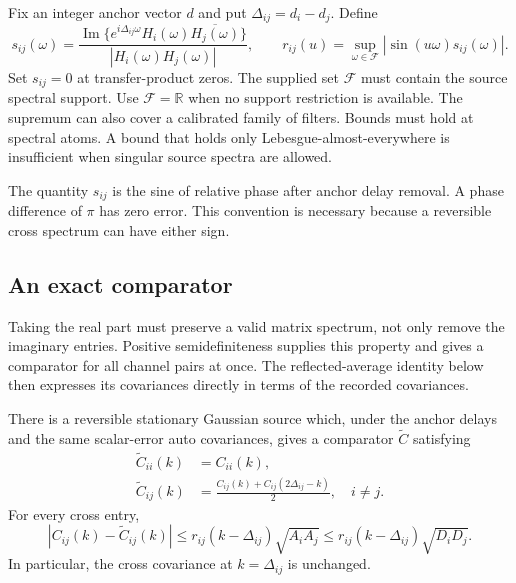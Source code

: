 Fix an integer anchor vector $d$ and put $\Delta_{ij}=d_i-d_j$. Define
\begin{equation}\label{eq:filterphase}
 s_{ij}(\omega)=
 \frac{\operatorname{Im}\{e^{i\Delta_{ij}\omega}
 H_i(\omega)\overline{H_j(\omega)}\}}
 {|H_i(\omega)H_j(\omega)|},\qquad
 r_{ij}(u)=\sup_{\omega\in\mathcal F}
 |\sin(u\omega)s_{ij}(\omega)|.
\end{equation}
Set $s_{ij}=0$ at transfer-product zeros. The supplied set $\mathcal F$
must contain the source spectral support. Use $\mathcal F=\mathbb R$
when no support restriction is available. The supremum can also cover a
calibrated family of filters. Bounds must hold at spectral atoms. A bound
that holds only Lebesgue-almost-everywhere is insufficient when singular
source spectra are allowed.

The quantity $s_{ij}$ is the sine of relative phase after anchor delay
removal. A phase difference of $\pi$ has zero error. This convention is
necessary because a reversible cross spectrum can have either sign.

\subsection{An exact comparator}

Taking the real part must preserve a valid matrix spectrum, not only remove the imaginary entries. Positive semidefiniteness supplies this property and gives a comparator for all channel pairs at once. The reflected-average identity below then expresses its covariances directly in terms of the recorded covariances.

\begin{theorem}\label{thm:filtercomparator}
There is a reversible stationary Gaussian source which, under the anchor
delays and the same scalar-error auto covariances, gives a comparator
$\widetilde C$ satisfying
\begin{align}
 \widetilde C_{ii}(k)&=C_{ii}(k),\nonumber\\
 \widetilde C_{ij}(k)&=
 \frac{C_{ij}(k)+C_{ij}(2\Delta_{ij}-k)}2,\quad i\ne j.
 \label{eq:filtercomparatoridentity}
\end{align}
For every cross entry,
\begin{equation}\label{eq:filterentrybound}
 |C_{ij}(k)-\widetilde C_{ij}(k)|
 \le r_{ij}(k-\Delta_{ij})\sqrt{A_iA_j}
 \le r_{ij}(k-\Delta_{ij})\sqrt{D_iD_j}.
\end{equation}
In particular, the cross covariance at $k=\Delta_{ij}$ is unchanged.
\end{theorem}

